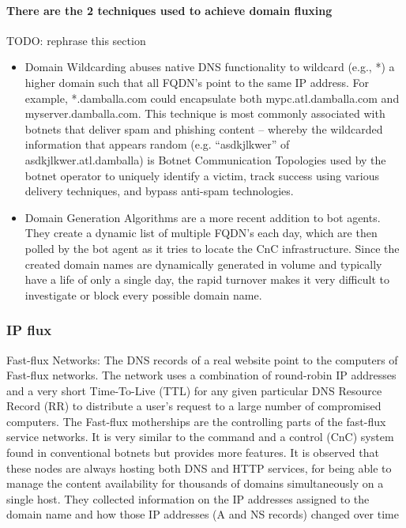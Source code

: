 \paragraph{There are the 2 techniques used to achieve domain fluxing}
TODO: rephrase this section
\begin{itemize}[noitemsep]
\item Domain Wildcarding abuses native DNS functionality to wildcard (e.g., *) a higher domain such that all FQDN’s point to the same IP address. For example, *.damballa.com could encapsulate both mypc.atl.damballa.com and myserver.damballa.com. This technique is most commonly associated with botnets that deliver spam and phishing content – whereby the wildcarded information that appears random (e.g. “asdkjlkwer” of asdkjlkwer.atl.damballa) is  Botnet Communication Topologies used by the botnet operator to uniquely identify a victim, track success using various delivery techniques, and bypass anti-spam technologies.
\item Domain Generation Algorithms are a more recent addition to bot agents. They create a dynamic list of multiple FQDN’s each day, which are then polled by the bot agent as it tries to locate the CnC infrastructure. Since the created domain names are dynamically generated in volume and typically have a life of only a single day, the rapid turnover makes it very difficult to investigate or block every possible domain name.
\end{itemize}

\subsubsection{IP flux}
Fast-flux Networks:
The DNS records of a real website point to the computers of
Fast-flux networks. The network uses a combination of
round-robin IP addresses and a very short Time-To-Live
(TTL) for any given particular DNS Resource Record (RR)
to distribute a user’s request to a large number of
compromised computers. The Fast-flux motherships are the
controlling parts of the fast-flux service networks. It is very
similar to the command and a control (CnC) system found in
conventional botnets but provides more features. It is
observed that these nodes are always hosting both DNS and
HTTP services, for being able to manage the content
availability for thousands of domains simultaneously on a
single host. They collected information on the IP addresses 
assigned to the domain name and how those IP addresses (A
and NS records) changed over time

